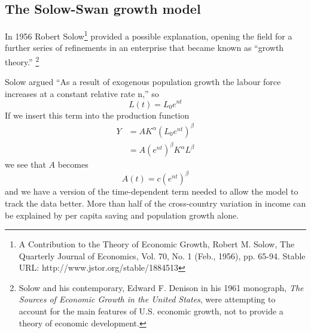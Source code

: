  \subsection{The Solow-Swan growth model}
In 1956 Robert Solow\footnote{A Contribution to the Theory of Economic Growth,  Robert M. Solow, The Quarterly Journal of Economics, Vol. 70, No. 1 (Feb., 1956), pp. 65-94. Stable URL: http://www.jstor.org/stable/1884513} provided a possible explanation, opening the field for a further series of refinements in an enterprise that became known as ``growth theory.''
\footnote{Solow and his contemporary, Edward F. Denison in his 1961 monograph, \textit{The Sources of Economic Growth in the United States}, were attempting to account for the main features of U.S. economic growth, not to provide a theory of economic development.}%

Solow argued ``As a result of exogenous population growth the labour force increases at a constant relative rate n,'' so
  \[L(t)= L_0e^{nt}\] 
If we insert this term into the production function 
\begin{eqnarray}
Y &= AK^\alpha (L_0e^{nt})^\beta\nonumber\\
  &= A(e^{nt})^{\beta}K^\alpha L^\beta
\label{eqn-solow-swan3}
\end{eqnarray}
we see that $A$ becomes
 \[A(t)=c(e^{nt})^\beta\]
and we have a version of the time-dependent term needed to  allow the model to track the data better. More than half  of the cross-country variation in income can be explained by per capita saving and population growth alone.




